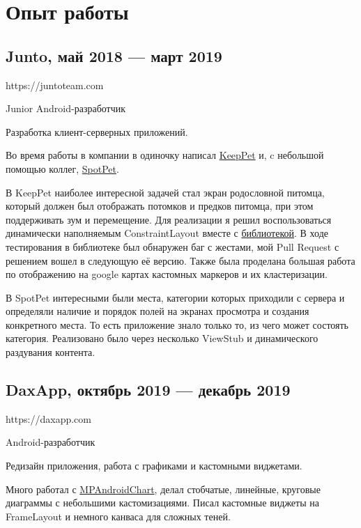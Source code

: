 \documentclass[a4paper,12pt]{article}
\begin{document}
    \section*{Опыт работы}

    \subsection*{Junto, май 2018 --- март 2019}
    
    https://juntoteam.com\par
    Junior Android-разработчик\par
    Разработка клиент-серверных приложений.\par

    Во время работы в компании в одиночку написал \href{https://play.google.com/store/apps/details?id=com.juntoteam.keeppet}{KeepPet} и, c небольшой помощью коллег, \href{https://play.google.com/store/apps/details?id=com.juntoteam.spotpet}{SpotPet}. 

    В KeepPet наиболее интересной задачей стал экран родословной питомца, который должен был отображать потомков и предков питомца, при этом поддерживать зум и перемещение. Для реализации я решил воспользоваться динамически наполняемым ConstraintLayout вместе с \href{https://github.com/natario1/ZoomLayout}{библиотекой}. В ходе тестирования в библиотеке был обнаружен баг с жестами, мой Pull Request с решением вошел в следующую её версию. Также была проделана большая работа по отображению на google картах  кастомных маркеров и их кластеризации.

    В SpotPet интересными были места, категории которых приходили с сервера и определяли наличие и порядок полей на экранах просмотра и создания конкретного места. То есть приложение знало только то, из чего может состоять категория. Реализовано было через несколько ViewStub и динамического раздувания контента.

    \subsection*{DaxApp, октябрь 2019 --- декабрь 2019}

    https://daxapp.com\par
    Android-разработчик\par
    Редизайн приложения, работа с графиками и кастомными виджетами.

    Много работал с \href{https://github.com/PhilJay/MPAndroidChart}{MPAndroidChart}, делал стобчатые, линейные, круговые диаграммы с небольшими кастомизациями. Писал кастомные виджеты на FrameLayout и немного канваса для сложных теней.
\end{document}

